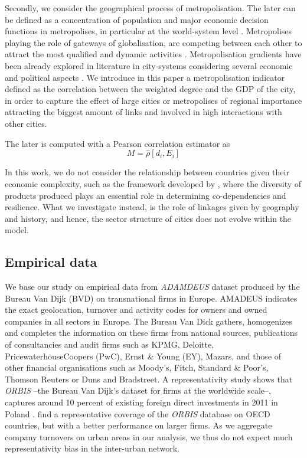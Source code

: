 \documentclass[10pt,letterpaper]{article}
\begin{document}
Secondly, we consider the geographical process of metropolisation. The later can be defined as a concentration of population and major economic decision functions in metropolises, in particular at the world-system level \cite{sassen1991global}. Metropolises playing the role of gateways of globalisation, are competing between each other to attract the most qualified and dynamic activities \cite{RozenblatPumain2007}. Metropolisation gradients have been already explored in literature in city-systems considering several economic and political aspects \cite{RozenblatPumain2018} \cite{PumainRozenblat2019} \cite{Zdanowskaetal2020}. We introduce in this paper a metropolisation indicator defined as the correlation between the weighted degree and the GDP of the city, in order to capture the effect of large cities or metropolises of regional importance attracting the biggest amount of links and involved in high interactions with other cities. 

The later is computed with a Pearson correlation estimator as
\begin{equation}
    M = \hat{\rho} \left[d_i , E_i \right]
\end{equation}

In this work, we do not consider the relationship between countries given their economic complexity, such as the framework developed by  \cite{hidalgo2007product}, where the diversity of products produced plays an essential role in determining co-dependencies and resilience.
What we investigate instead, is the role of linkages given by geography and history, and hence, the sector structure of cities does not evolve within the model.

\subsection*{Empirical data}

We base our study on empirical data from \emph{ADAMDEUS} dataset produced by the Bureau Van Dijk (BVD) on transnational firms in Europe. AMADEUS indicates the exact geolocation, turnover and activity codes for owners and owned companies in all sectors in Europe. The Bureau Van Dick gathers, homogenizes and completes the information on these firms from national sources, publications of consultancies and audit firms such as KPMG, Deloitte, PricewaterhouseCoopers (PwC), Ernst \& Young (EY), Mazars, and those of other financial organisations such as Moody's, Fitch, Standard \& Poor's, Thomson Reuters or Duns and Bradstreet. A representativity study shows that \emph{ORBIS} --the Bureau Van Dijk's dataset for firms at the worldwide scale--, captures around 10 percent of existing foreign direct investments in 2011 in Poland \cite{Zdanowska2018}.
\cite{bajgar2020coverage} find a representative coverage of the \emph{ORBIS} database on OECD countries, but with a better performance on larger firms. As we aggregate company turnovers on urban areas in our analysis, we thus do not expect much representativity bias in the inter-urban network.
\end{document}
